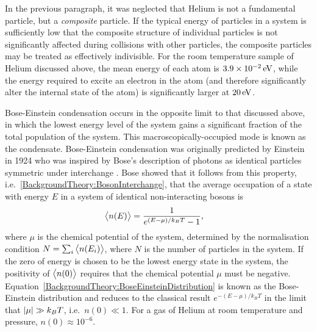 In the previous paragraph, it was neglected that Helium is not a fundamental particle, but a \emph{composite} particle.  If the typical energy of particles in a system is sufficiently low that the composite structure of individual particles is not significantly affected during collisions with other particles, the composite particles may be treated as effectively indivisible.  For the room temperature sample of Helium discussed above, the mean energy of each atom is $3.9\times\unit[10^{-2}]{eV}$, while the energy required to excite an electron in the atom (and therefore significantly alter the internal state of the atom) is significantly larger at $\unit[20]{eV}$.

Bose-Einstein condensation occurs in the opposite limit to that discussed above, in which the lowest energy level of the system gains a significant fraction of the total population of the system.  This macroscopically-occupied mode is known as the condensate.  Bose-Einstein condensation was originally predicted by Einstein \citep{Einstein:1924,Einstein:1925} in 1924 who was inspired by Bose's description of photons as identical particles symmetric under interchange \citep{Bose:1924}.  Bose showed that it follows from this property, i.e.\ \eqref{BackgroundTheory:BosonInterchange}, that the average occupation of a state with energy $E$ in a system of identical non-interacting bosons is
\begin{align}
    \mean{n(E)} &= \frac{1}{e^{(E - \mu)/k_B T} - 1}, \label{BackgroundTheory:BoseEinsteinDistribution}
\end{align}
where $\mu$ is the chemical potential of the system, determined by the normalisation condition $N = \sum_i {\big<n(E_i)\big>}$, where $N$ is the number of particles in the system.  If the zero of energy is chosen to be the lowest energy state in the system, the positivity of ${\big<n(0)\big>}$ requires that the chemical potential $\mu$ must be negative.  Equation~\eqref{BackgroundTheory:BoseEinsteinDistribution} is known as the Bose-Einstein distribution and reduces to the classical result $e^{-(E - \mu)/k_B T}$ in the limit that $\left|\mu\right| \gg k_B T$, i.e.\ $n(0) \ll 1$.  For a gas of Helium at room temperature and pressure, $n(0) \approx 10^{-6}$.

